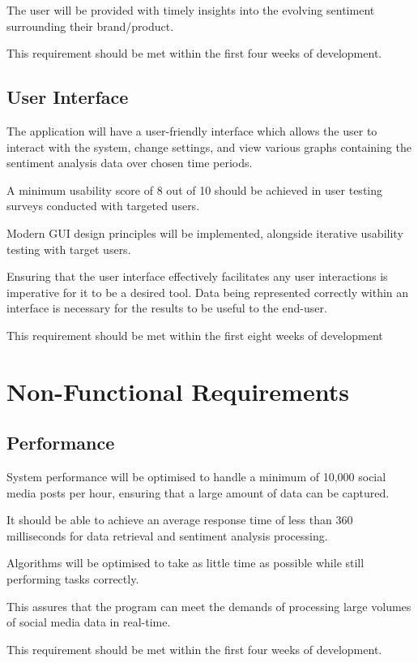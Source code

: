    The user will be provided with timely insights into the evolving sentiment surrounding their brand/product.

    This requirement should be met within the first four weeks of development.

    \subsection{User Interface}
    The application will have a user-friendly interface which allows the user to interact with the system, change settings, and view various graphs containing the sentiment analysis data over chosen time periods.

    A minimum usability score of 8 out of 10 should be achieved in user testing surveys conducted with targeted users.

    Modern GUI design principles will be implemented, alongside iterative usability testing with target users.

    Ensuring that the user interface effectively facilitates any user interactions is imperative for it to be a desired tool. Data being represented correctly within an interface is necessary for the results to be useful to the end-user.

    This requirement should be met within the first eight weeks of development

\section{Non-Functional Requirements}

    \subsection{Performance}
    System performance will be optimised to handle a minimum of 10,000 social media posts per hour, ensuring that a large amount of data can be captured.

    It should be able to achieve an average response time of less than 360 milliseconds for data retrieval and sentiment analysis processing.

    Algorithms will be optimised to take as little time as possible while still performing tasks correctly.

    This assures that the program can meet the demands of processing large volumes of social media data in real-time.

    This requirement should be met within the first four weeks of development.

